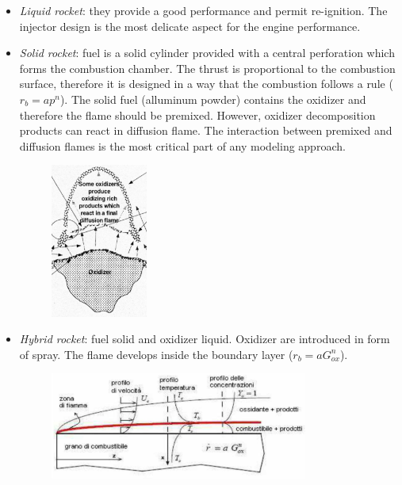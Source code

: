 \documentclass[12pt]{article}
\begin{document}
\begin{itemize}
    \item \textit{Liquid rocket}: they provide a good performance and permit re-ignition. The injector design is the most delicate aspect for the engine performance.
    \item \textit{Solid rocket}: fuel is a solid cylinder provided with a central perforation which forms the combustion chamber. The thrust is proportional to the combustion surface, therefore it is designed in a way that the combustion follows a rule ($r_{b}=ap^{n}$). The solid fuel (alluminum powder) contains the oxidizer and therefore the flame should be premixed. However, oxidizer decomposition products can react in diffusion flame. The interaction between premixed and diffusion flames is the most critical part of any modeling approach.
    
\begin{figure}[h!]
\centering
\includegraphics[width=0.3\textwidth]{figures/flame_solid.png}
\end{figure}
    
    \item \textit{Hybrid rocket}: fuel solid and oxidizer liquid. Oxidizer are introduced in form of spray. The flame develops inside the boundary layer ($r_{b}=aG_{ox}^{n}$).
    
\begin{figure}[h!]
\centering
\includegraphics[width=0.8\textwidth]{figures/hybrid.png}
\end{figure}

\end{itemize}
\end{document}
